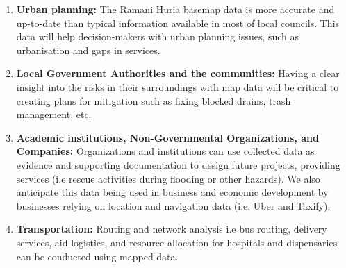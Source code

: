 \documentclass[a4paper,12pt,twoside]{article}
\begin{document}
\begin{mdframed}[hidealllines=true,backgroundcolor=RHgreen!10,innerleftmargin=6pt,innerrightmargin=6pt,leftmargin=-3pt,rightmargin=-3pt]
\begin{enumerate}
    
\item \textbf{Urban planning:} The Ramani Huria basemap data is more accurate and up-to-date than typical information available in most of local councils. This data will help decision-makers with urban planning issues, such as urbanisation and gaps in services.
\item \textbf{Local Government Authorities and the communities:} Having a clear insight into the risks in their surroundings with map data will be critical  to creating plans for mitigation such as fixing blocked drains, trash management, etc.
\item \textbf{Academic institutions, Non-Governmental Organizations, and Companies:} Organizations and institutions can use collected data as evidence and supporting documentation to design future projects, providing services (i.e rescue activities during flooding or other hazards). We also anticipate this data being used in business and economic development by businesses relying on location and navigation data (i.e. Uber and Taxify).
\item \textbf{Transportation:} Routing and network analysis i.e bus routing, delivery services, aid logistics, and resource allocation for hospitals and dispensaries can be conducted using mapped data.

\end{enumerate}
\end{mdframed}
\end{document}
